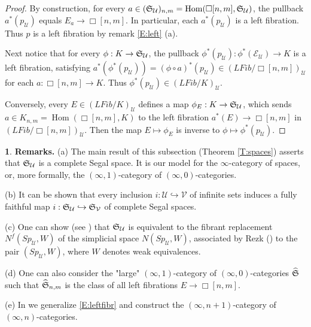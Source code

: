\documentclass[12pt]{amsart}
\theoremstyle{plain}
\theoremstyle{definition}
\newtheorem{Emp}[Thm]{}
\numberwithin{equation}{section}
\newcommand{\cal}[1]{\mathcal{#1}}
\newcommand{\C}[1]{\cal#1}
\newcommand{\hra}{\hookrightarrow}
\newcommand{\wh}{\widehat}
\newcommand{\re}[1]{\ref{E:#1}}
\newcommand{\rt}[1] {Theorem \ref{T:#1}}
\newcommand{\Hom}{\operatorname{Hom}}
\renewcommand{\S}{\frak{S}}
\begin{document}
\begin{proof}
By construction, for every
$a\in(\S_{\C{U}})_{n,m}=\Hom(\Box[n,m],\S_{\C{U}})$, the pullback
$a^*(p_{\C{U}})$ equals $E_{a}\to\Box[n,m]$. In particular, each
$a^*(p_{\C{U}})$ is a left fibration. Thus $p$ is a left fibration
by remark \re{left} (a).

Next notice that for every $\phi:K\to \S_{\C{U}}$, the pullback
$\phi^*(p_{\C{U}}):\phi^*(\C{E}_{\C{U}})\to K$ is a left
fibration, satisfying $a^*(\phi^*(p_{\C{U}}))=(\phi\circ
a)^*(p_{\C{U}})\in (LFib/\Box[n,m])_{\C{U}}$ for each
$a:\Box[n,m]\to K$. Thus $\phi^*(p_{\C{U}})\in (LFib/K)_{\C{U}}$.

Conversely, every  $E\in (LFib/K)_{\C{U}}$ defines a map
$\phi_E:K\to \S_{\C{U}}$, which sends $a\in
K_{n,m}=\Hom(\Box[n,m],K)$ to the left fibration
$a^*(E)\to\Box[n,m]$ in $(LFib/\Box[n,m])_{\C{U}}$. Then the map
$E\mapsto \phi_E$ is inverse to $\phi\mapsto \phi^*(p_{\C{U}})$.
\end{proof}



\begin{Emp} \label{E:remsu}
{\bf Remarks.} (a) The main result of this subsection
(\rt{spaces}) asserts that $\S_{\C{U}}$ is a complete Segal
space. It is our model for the $\infty$-category of spaces, or,
more formally, the $(\infty,1)$-category of
$(\infty,0)$-categories.

(b) It can be shown that every inclusion $i:\C{U}\hra\C{V}$ of
infinite sets induces a fully faithful map $i:\S_{\C{U}}\hra
\S_{\C{V}}$ of complete Segal spaces.

(c) One can show (see \cite{KV2}) that $\S_{\C{U}}$ is equivalent
to the fibrant replacement $N^f(Sp_{\C{U}},W)$ of the simplicial
space $N(Sp_{\C{U}},W)$, associated by Rezk (\cite[3.3]{Re}) to
the pair $(Sp_{\C{U}},W)$, where $W$ denotes weak equivalences.

(d) One can also consider the "large" $(\infty,1)$-category of
$(\infty,0)$-categories $\wh{\S}$ such that $\wh{\S}_{n,m}$ is the
class of all left fibrations $E\to\Box[n,m]$.

(e) In \cite{KV2} we generalize \re{leftfibr} and construct the
$(\infty,n+1)$-category of $(\infty,n)$-categories.
\end{Emp}
\end{document}
